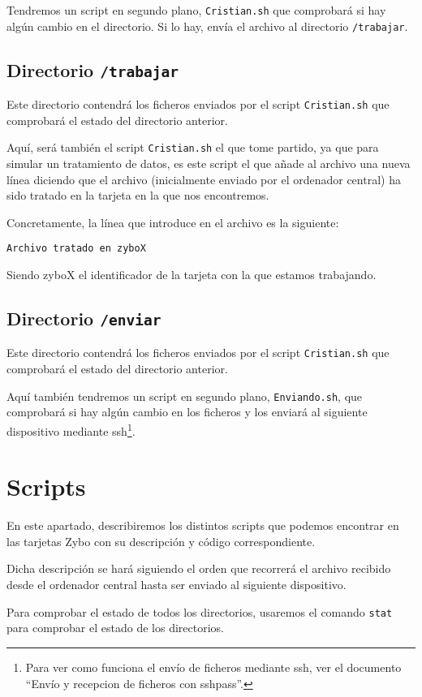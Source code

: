 \documentclass[12pt,letterpaper]{article}
\begin{document}
Tendremos un script en segundo plano, \texttt{Cristian.sh} que comprobará si hay algún cambio en el directorio. Si lo hay, envía el archivo al directorio \texttt{/trabajar}.

\subsection{Directorio \texttt{/trabajar}}
Este directorio contendrá los ficheros enviados por el script \texttt{Cristian.sh} que comprobará el estado del directorio anterior.

Aquí, será también el script \texttt{Cristian.sh} el que tome partido, ya que para simular un tratamiento de datos, es este script el que añade al archivo una nueva línea diciendo que el archivo (inicialmente enviado por el ordenador central) ha sido tratado en la tarjeta en la que nos encontremos.

Concretamente, la línea que introduce en el archivo es la siguiente:
\begin{center}
	\texttt{Archivo tratado en zyboX}
\end{center}

Siendo zyboX el identificador de la tarjeta con la que estamos trabajando.

\subsection{Directorio \texttt{/enviar}}
Este directorio contendrá los ficheros enviados por el script \texttt{Cristian.sh} que comprobará el estado del directorio anterior.

Aquí también tendremos un script en segundo plano, \texttt{Enviando.sh}, que comprobará si hay algún cambio en los ficheros y los enviará al siguiente dispositivo mediante ssh\footnote{Para ver como funciona el envío de ficheros mediante ssh, ver el documento ``Envío y recepcion de ficheros con sshpass''.}.


\section{Scripts}
En este apartado, describiremos los distintos scripts que podemos encontrar en las tarjetas Zybo con su descripción y código correspondiente.

Dicha descripción se hará siguiendo el orden que recorrerá el archivo recibido desde el ordenador central hasta ser enviado al siguiente dispositivo.

Para comprobar el estado de todos los directorios, usaremos el comando \texttt{stat} para comprobar el estado de los directorios.
\end{document}
